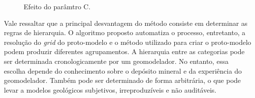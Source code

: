 \begin{figure}[H]
    \caption{Efeito do parâmtro C.} \label{fig:sensitivity_c}
     \centering
     \hspace{1em}
     \hspace{1em}
\end{figure}

Vale ressaltar que a principal desvantagem do método consiste em determinar as regras de hierarquia. O algoritmo proposto automatiza o processo, entretanto, a resolução do \textit{grid} do proto-modelo e o método utilizado para criar o proto-modelo podem produzir diferentes agrupamentos. A hierarquia entre as categorias pode ser determinada cronologicamente por um geomodelador. No entanto, essa escolha depende do conhecimento sobre o depósito mineral e da experiência do geomodelador. Também pode ser determinado de forma arbitrária, o que pode levar a modelos geológicos subjetivos, irreproduzíveis e não auditáveis.

